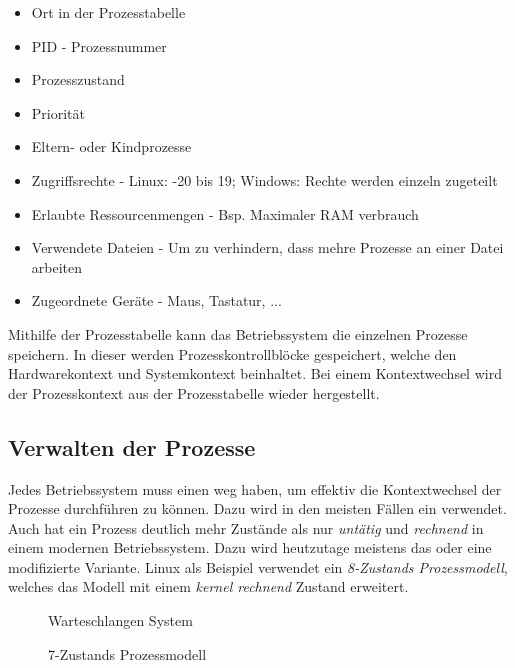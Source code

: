 \begin{itemize}
    \setlength\itemsep{0pt}
    \item Ort in der Prozesstabelle
    \item PID - Prozessnummer
    \item Prozesszustand
    \item Priorität
    \item Eltern- oder Kindprozesse
    \item Zugriffsrechte - Linux: -20 bis 19; Windows: Rechte werden einzeln zugeteilt
    \item Erlaubte Ressourcenmengen - Bsp. Maximaler RAM verbrauch
    \item Verwendete Dateien - Um zu verhindern, dass mehre Prozesse an einer Datei arbeiten
    \item Zugeordnete Geräte - Maus, Tastatur, ...
\end{itemize}

Mithilfe der Prozesstabelle kann das Betriebssystem die einzelnen Prozesse speichern. In dieser werden Prozesskontrollblöcke gespeichert, welche den Hardwarekontext und Systemkontext beinhaltet. Bei einem Kontextwechsel wird der Prozesskontext aus der Prozesstabelle wieder hergestellt.

\newpage

\subsection{Verwalten der Prozesse}

Jedes Betriebssystem muss einen weg haben, um effektiv die Kontextwechsel der Prozesse durchführen zu können. Dazu wird in den meisten Fällen ein  verwendet. Auch hat ein Prozess deutlich mehr Zustände als nur \textit{untätig} und \textit{rechnend} in einem modernen Betriebssystem. Dazu wird heutzutage meistens das  oder eine modifizierte Variante. Linux als Beispiel verwendet ein \textit{8-Zustands Prozessmodell}, welches das Modell mit einem \textit{kernel rechnend} Zustand erweitert.

\begin{figure}[h]
    \centering
    
    \caption{Warteschlangen System}
    \label{Warteschlange Prozesse}
\end{figure}

\begin{figure}[h]
    \centering
    
    \caption{7-Zustands Prozessmodell}
    \label{Prozessmodell}
\end{figure}

